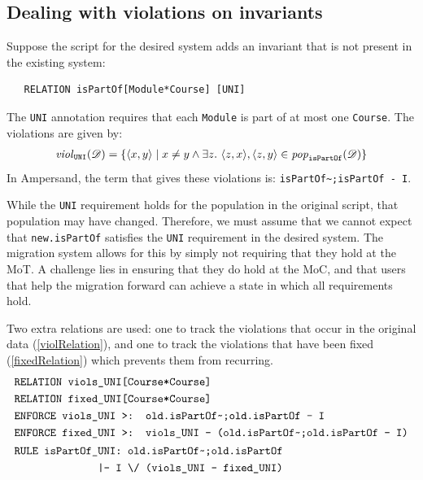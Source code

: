 \documentclass[runningheads]{llncs}
\newcommand{\id}[1]{\text{\it #1\/}}
\newcommand{\pop}[2]{\id{pop}_{#1}(#2)}
\newcommand{\viol}[2]{\violC{#1}(#2)}
\newcommand{\violC}[1]{\id{viol}_{#1}}
\newcommand{\pair}[2]{\langle{#1},{#2}\rangle}
\newcommand{\dataset}{\mathscr{D}}
\begin{document}
   \subsection{Dealing with violations on invariants}
   Suppose the script for the desired system adds an invariant that is not present in the existing system:
   
   \begin{verbatim}
   RELATION isPartOf[Module*Course] [UNI]
   \end{verbatim}
   
   The \verb=UNI= annotation requires that each \verb=Module= is part of at most one \verb=Course=.
   The violations are given by:
   \begin{eqnarray}
   \viol{\tt UNI}{\dataset} = \{\pair{x}{y} \mid x \neq y \wedge \exists z.~ \pair{z}{x}, \pair{z}{y}\in\pop{\tt isPartOf}{\dataset} \}
   \end{eqnarray}
   In Ampersand, the term that gives these violations is: \verb=isPartOf~;isPartOf - I=.
   
   While the \verb=UNI= requirement holds for the population in the original script, that population may have changed.
   Therefore, we must assume that we cannot expect that \verb=new.isPartOf= satisfies the \verb=UNI= requirement in the desired system.
   The migration system allows for this by simply not requiring that they hold at the MoT.
   A challenge lies in ensuring that they do hold at the MoC, and that users that help the migration forward can achieve a state in which all requirements hold.
   
   Two extra relations are used: one to track the violations that occur in the original data (\ref{violRelation}), and one to track the violations that have been fixed (\ref{fixedRelation}) which prevents them from recurring.
   \begin{align}
   &\text{\tt RELATION viols\_UNI[Course*Course]}\label{violRelation}\\
   &\text{\tt RELATION fixed\_UNI[Course*Course]}\label{fixedRelation}\\
   &\text{\tt ENFORCE viols\_UNI >: old.isPartOf\textasciitilde;old.isPartOf - I}\label{fill viols}\\
   &\text{\tt ENFORCE fixed\_UNI >: viols\_UNI - (old.isPartOf\textasciitilde;old.isPartOf - I)}\label{fill fixed}\\
   &\begin{aligned}
   \text{\tt RULE isPartOf\_UNI: old.isPartOf\textasciitilde;old.isPartOf}\\
   \quad\text{\tt |- I \textbackslash/ (viols\_UNI - fixed\_UNI)}
   \end{aligned}\label{rule uni}
   \end{align}
   
\end{document}
